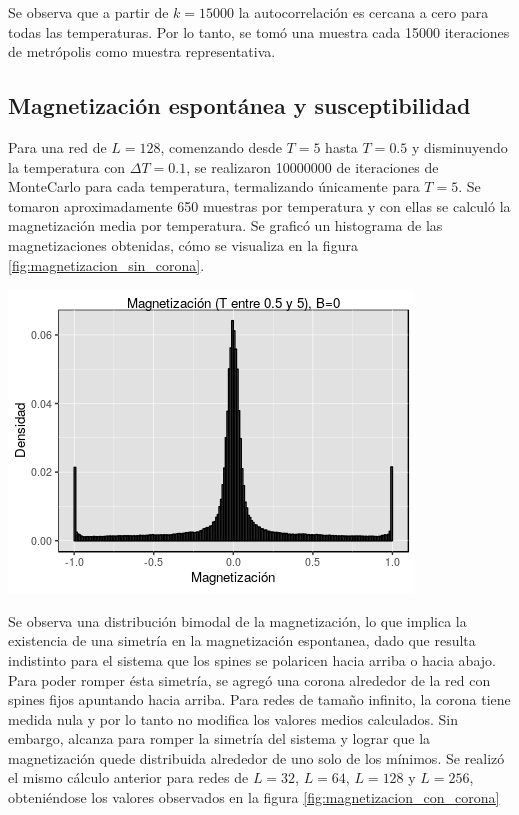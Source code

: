 \documentclass[%
 reprint,
 amsmath,amssymb,
 aps,
spanish]{revtex4-1}
\begin{document}
Se observa que a partir de $k=15000$ la autocorrelación es cercana a cero para todas las temperaturas. Por lo tanto, se tomó una muestra cada 15000 iteraciones de metrópolis como muestra representativa.

\subsection{Magnetización espontánea y susceptibilidad}
Para una red de $L=128$, comenzando desde $T=5$ hasta $T=0.5$ y disminuyendo la temperatura con $\Delta T=0.1$, se realizaron 10000000 de iteraciones de MonteCarlo para cada temperatura, termalizando únicamente para $T=5$. Se tomaron aproximadamente 650 muestras por temperatura y con ellas se calculó la magnetización media por temperatura. Se graficó un histograma de las magnetizaciones obtenidas, cómo se visualiza en la figura \ref{fig:magnetizacion_sin_corona}.   

\begin{minipage}{0.45\textwidth}									
\centering
\includegraphics[totalheight=0.25\textheight]{imagenes/sin_corona/magnetizacion.png}
\label{fig:magnetizacion_sin_corona}
\end{minipage}

Se observa una distribución bimodal de la magnetización, lo que implica la existencia de una simetría en la magnetización espontanea, dado que resulta indistinto para el sistema que los spines se polaricen hacia arriba o hacia abajo.\\
Para poder romper ésta simetría, se agregó una corona alrededor de la red con spines fijos apuntando hacia arriba. Para redes de tamaño infinito, la corona tiene medida nula y por lo tanto no modifica 
los valores medios calculados. Sin embargo, alcanza para romper la simetría del sistema y lograr que la magnetización quede distribuida alrededor de uno solo de los mínimos.
Se realizó el mismo cálculo anterior para redes de $L=32$, $L=64$, $L=128$ y $L=256$, obteniéndose los valores observados en la figura \ref{fig:magnetizacion_con_corona}
\end{document}
